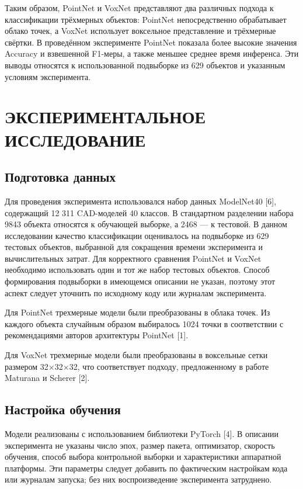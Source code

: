 \documentclass{misisarticle}
\begin{document}
\FloatBarrier
Таким образом, PointNet и VoxNet представляют два различных подхода к классификации трёхмерных объектов: PointNet непосредственно обрабатывает облако точек, а VoxNet использует воксельное представление и трёхмерные свёртки. В проведённом эксперименте PointNet показала более высокие значения Accuracy и взвешенной F1-меры, а также меньшее среднее время инференса. Эти выводы относятся к использованной подвыборке из 629 объектов и указанным условиям эксперимента.\par
\FloatBarrier
\section{ЭКСПЕРИМЕНТАЛЬНОЕ ИССЛЕДОВАНИЕ}
\subsection{Подготовка данных}
Для проведения эксперимента использовался набор данных ModelNet40 [6], содержащий 12 311 CAD-моделей 40 классов. В стандартном разделении набора 9843 объекта относятся к обучающей выборке, а 2468 — к тестовой. В данном исследовании качество классификации оценивалось на подвыборке из 629 тестовых объектов, выбранной для сокращения времени эксперимента и вычислительных затрат. Для корректного сравнения PointNet и VoxNet необходимо использовать один и тот же набор тестовых объектов. Способ формирования подвыборки в имеющемся описании не указан, поэтому этот аспект следует уточнить по исходному коду или журналам эксперимента.\par
Для PointNet трехмерные модели были преобразованы в облака точек. Из каждого объекта случайным образом выбиралось 1024 точки в соответствии с рекомендациями авторов архитектуры PointNet [1].\par
Для VoxNet трехмерные модели были преобразованы в воксельные сетки размером 32×32×32, что соответствует подходу, предложенному в работе Maturana и Scherer [2].\par
\subsection{Настройка обучения}

Модели реализованы с использованием библиотеки PyTorch [4]. В описании эксперимента не указаны число эпох, размер пакета, оптимизатор, скорость обучения, способ выбора контрольной выборки и характеристики аппаратной платформы. Эти параметры следует добавить по фактическим настройкам кода или журналам запуска; без них воспроизведение эксперимента затруднено.\par
\end{document}
